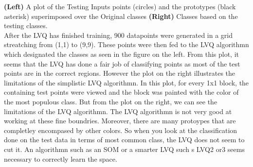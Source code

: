 \documentclass[epsfig]{article}
\begin{document}
\textbf{(Left)} A plot of the Testing Inputs points (circles) and the prototypes (black asterisk) superimposed over the Original classes \textbf{(Right)} Classes based on the testing classes.\\
\newline
After the LVQ has finished training, 900 datapoints were generated in a grid streatching from (1,1) to (9,9). These points were then fed to the LVQ algorithmn which designated the classes as seen in the figure on the left. From this plot, it seems that the LVQ has done a fair job of classifying points as most of the test points are in the correct regions. However the plot on the right illustrates the limitations of the simplistic LVQ algorithmn. In this plot, for every 1x1 block, the containing test points were viewed and the block was painted with the color of the most populous class. But from the plot on the right, we can see the limitations of the LVQ algorithmn. The LVQ algorithmn is not very good at working at these fine boundries. Moreover, there are many protoypes that are completley encompased by other colors. So when you look at the classification done on the test data in terms of most common class, the LVQ does not seem to cut it. An algorithmn such as an SOM or a smarter LVQ such s LVQ2 or3 seems necessary to correctly learn the space.
\newpage
\end{document}

